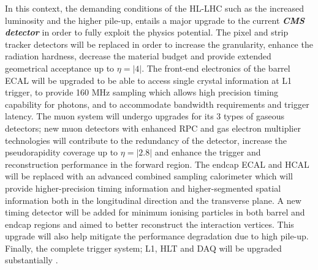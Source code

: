 In this context, the demanding conditions of the HL-LHC such as the increased luminosity and the higher pile-up, entails a major upgrade to the current \emph{\textbf{CMS detector}} in order to fully exploit the physics potential. The pixel and strip tracker detectors will be replaced in order to increase the granularity, enhance the radiation hardness, decrease the material budget and provide extended geometrical acceptance up to $\eta = |4|$. The front-end electronics of the barrel ECAL will be upgraded to be able to access single crystal information at L1 trigger, to provide 160 MHz sampling which allows high precision timing capability for photons, and to accommodate bandwidth requirements and trigger latency. The muon system will undergo upgrades for its 3 types of gaseous detectors; new muon detectors with enhanced RPC and gas electron multiplier technologies will contribute to the redundancy of the detector, increase the pseudorapidity coverage up to $ \eta = |2.8|$ and enhance the trigger and reconstruction performance in the forward region. The endcap ECAL and HCAL will be replaced with an advanced combined sampling calorimeter which will provide higher-precision timing information and higher-segmented spatial information both in the longitudinal direction and the transverse plane. A new timing detector will be added for minimum ionising particles in both barrel and endcap regions and aimed to better reconstruct the interaction vertices. This upgrade will also help mitigate the performance degradation due to high pile-up. Finally, the complete trigger system; L1, HLT and DAQ will be upgraded substantially \cite{Contardo:2020886}.